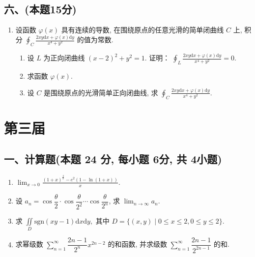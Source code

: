 \subsection*{六、(本题15分)}

\begin{enumerate}[start=10]
    \item 设函数 $\varphi(x)$ 具有连续的导数,  在围绕原点的任意光滑的简单闭曲线 $C$ 上,  积分 $\displaystyle\oint_C \frac{2xy  \mathrm{d}x + \varphi(x)  \mathrm{d}y}{x^4 + y^2}$ 的值为常数.
          \begin{enumerate}
              \item [(1)]设 $L$ 为正向闭曲线 $(x - 2)^2 + y^2 = 1$. 证明：
                    $\displaystyle\oint_L \frac{2xy  \mathrm{d}x + \varphi(x)  \mathrm{d}y}{x^4 + y^2} = 0.$
              \item [(2)] 求函数 $\varphi(x)$.
              \item [(3)] 设 $C$ 是围绕原点的光滑简单正向闭曲线,  求 $\displaystyle\oint_C \frac{2xy  \mathrm{d}x + \varphi(x)  \mathrm{d}y}{x^4 + y^2}$.
          \end{enumerate}
\end{enumerate}


\newpage
\section{第三届}

\subsection*{一、计算题(本题 24 分,  每小题 6分,  共 4小题)}
\begin{enumerate}
    \item $\displaystyle\lim_{x \to 0} \frac{(1+x)^{\frac{2}{x}} - e^2(1 - \ln(1+x))}{x}.$
    \item 设 $a_n = \cos \dfrac{\theta}{2} \cdot \cos \dfrac{\theta}{2^2} \cdots \cos \dfrac{\theta}{2^n}$,  求 $\displaystyle\lim_{n \to \infty} a_n$.
    \item 求
          $\displaystyle\iint\limits_D \text{sgn}(xy-1) \mathrm{d}x  \mathrm{d}y, $
          其中 $D = \{(x,  y) \mid 0 \leq x \leq 2,  0 \leq y \leq 2\}$.
    \item 求幂级数
          $\displaystyle\sum_{n=1}^{\infty} \dfrac{2n-1}{2^n} x^{2n-2}$ 的和函数,  并求级数
          $\displaystyle\sum_{n=1}^{\infty} \dfrac{2n-1}{2^{2n-1}}$ 的和.
\end{enumerate}

